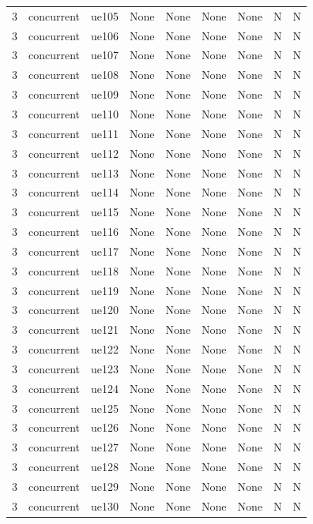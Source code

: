 \begin{table}[ht]
\begin{tabular}{|c|c|c|c|c|c|c|c|c|}
3 & concurrent & ue105 & None & None & None & None & N & N \\
3 & concurrent & ue106 & None & None & None & None & N & N \\
3 & concurrent & ue107 & None & None & None & None & N & N \\
3 & concurrent & ue108 & None & None & None & None & N & N \\
3 & concurrent & ue109 & None & None & None & None & N & N \\
3 & concurrent & ue110 & None & None & None & None & N & N \\
3 & concurrent & ue111 & None & None & None & None & N & N \\
3 & concurrent & ue112 & None & None & None & None & N & N \\
3 & concurrent & ue113 & None & None & None & None & N & N \\
3 & concurrent & ue114 & None & None & None & None & N & N \\
3 & concurrent & ue115 & None & None & None & None & N & N \\
3 & concurrent & ue116 & None & None & None & None & N & N \\
3 & concurrent & ue117 & None & None & None & None & N & N \\
3 & concurrent & ue118 & None & None & None & None & N & N \\
3 & concurrent & ue119 & None & None & None & None & N & N \\
3 & concurrent & ue120 & None & None & None & None & N & N \\
3 & concurrent & ue121 & None & None & None & None & N & N \\
3 & concurrent & ue122 & None & None & None & None & N & N \\
3 & concurrent & ue123 & None & None & None & None & N & N \\
3 & concurrent & ue124 & None & None & None & None & N & N \\
3 & concurrent & ue125 & None & None & None & None & N & N \\
3 & concurrent & ue126 & None & None & None & None & N & N \\
3 & concurrent & ue127 & None & None & None & None & N & N \\
3 & concurrent & ue128 & None & None & None & None & N & N \\
3 & concurrent & ue129 & None & None & None & None & N & N \\
3 & concurrent & ue130 & None & None & None & None & N & N \\

\end{tabular}
\end{table}
